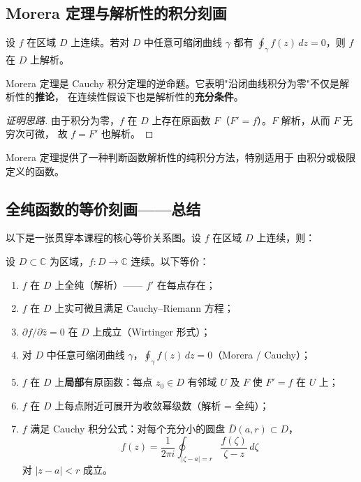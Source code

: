 \subsection{Morera 定理与解析性的积分刻画}

\begin{theorem}
设 $f$ 在区域 $D$ 上连续。若对 $D$ 中任意可缩闭曲线 $\gamma$ 都有
$\displaystyle\oint_\gamma f(z)\,dz = 0$，则 $f$ 在 $D$ 上解析。
\end{theorem}

\begin{remark}
Morera 定理是 Cauchy 积分定理的逆命题。它表明"沿闭曲线积分为零"不仅是解析性的\textbf{推论}，
在连续性假设下也是解析性的\textbf{充分条件}。
\end{remark}

\begin{proof}[证明思路]
由于积分为零，$f$ 在 $D$ 上存在原函数 $F$（$F' = f$）。$F$ 解析，从而 $F$ 无穷次可微，
故 $f = F'$ 也解析。
\end{proof}

Morera 定理提供了一种判断函数解析性的纯积分方法，特别适用于
由积分或极限定义的函数。

\subsection{全纯函数的等价刻画——总结}

以下是一张贯穿本课程的核心等价关系图。设 $f$ 在区域 $D$ 上连续，则：

\begin{theorem}[全纯性的等价刻画]
设 $D \subset \mathbb{C}$ 为区域，$f: D \to \mathbb{C}$ 连续。以下等价：
\begin{enumerate}
  \item $f$ 在 $D$ 上全纯（解析）—— $f'$ 在每点存在；
  \item $f$ 在 $D$ 上实可微且满足 Cauchy--Riemann 方程；
  \item $\partial f / \partial \bar{z} = 0$ 在 $D$ 上成立（Wirtinger 形式）；
  \item 对 $D$ 中任意可缩闭曲线 $\gamma$，$\displaystyle\oint_\gamma f(z)\,dz = 0$（Morera / Cauchy）；
  \item $f$ 在 $D$ 上\textbf{局部}有原函数：每点 $z_0 \in D$ 有邻域 $U$ 及 $F$ 使 $F' = f$ 在 $U$ 上；
  \item $f$ 在 $D$ 上每点附近可展开为收敛幂级数（解析 = 全纯）；
  \item $f$ 满足 Cauchy 积分公式：对每个充分小的圆盘 $\overline{D}(a,r) \subset D$，
    \[
      f(z) = \frac{1}{2\pi i}\oint_{|\zeta-a|=r} \frac{f(\zeta)}{\zeta - z}\,d\zeta
    \]
    对 $|z-a| < r$ 成立。
\end{enumerate}
\end{theorem}

